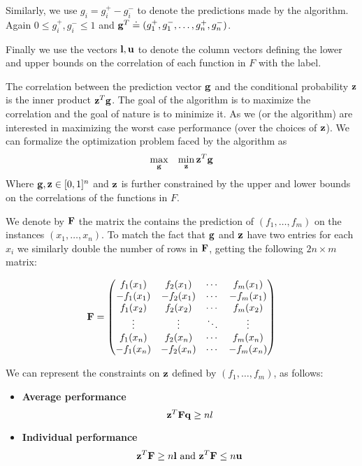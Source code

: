 \documentclass{article}[12pt]
\begin{document}
Similarly, we use $g_i =g_i^+ - g_i^-$ to denote the predictions made
by the algorithm. Again $0 \leq g_i^+,g_i^- \leq 1$ and 
$\mathbf{g}^T \doteq (g_1^+,g_1^-,\ldots, g_n^+,g_n^-)$.

Finally we use the vectors $\mathbf{l},\mathbf{u}$ to denote the column vectors 
defining the lower and upper bounds on the correlation of each
function in $F$ with the label.

The correlation between the prediction vector $\mathbf{g}$ and the
conditional probability $\mathbf{z}$ is the inner product $\mathbf{z}^T \mathbf{g}$. The
goal of the algorithm is to maximize the correlation and the goal of
nature is to minimize it. As we (or the algorithm) are interested in
maximizing the worst case performance (over the choices of $\mathbf{z}$). We
can formalize the optimization problem faced by the algorithm as
\[
\max_{\mathbf{g}}\;\;\; \min_{\mathbf{z}} \mathbf{z}^T \mathbf{g}
\]
Where $\mathbf{g},\mathbf{z} \in [0,1]^n$ and $\mathbf{z}$ is further constrained by the
upper and lower bounds on the correlations of the functions in $F$.

We denote by $\mathbf{F}$ the matrix the contains the prediction of
$(f_1,\ldots,f_m)$ on the instances $(x_1,\ldots,x_n)$. To match the
fact that $\mathbf{g}$ and $\mathbf{z}$ have two entries for each $x_i$ we similarly
double the number of rows in $\mathbf{F}$, getting the following $2n \times
m$ matrix:

\begin{equation}
\mathbf{F} = 
 \begin{pmatrix}
   f_1(x_1) &  f_2(x_1) & \cdots &  f_m(x_1) \\
  -f_1(x_1) & -f_2(x_1) & \cdots & -f_m(x_1) \\
   f_1(x_2) &  f_2(x_2) & \cdots &  f_m(x_2) \\
   \vdots   & \vdots    & \ddots &  \vdots  \\
   f_1(x_n)  &  f_2(x_n)  & \cdots &   f_m(x_n) \\
  -f_1(x_n)  & -f_2(x_n)  & \cdots &  -f_m(x_n) 
 \end{pmatrix}
\end{equation}

We can represent the constraints on $\mathbf{z}$ defined by
$(f_1,\ldots,f_m)$, as follows:
\begin{itemize}
\item {\bf Average performance}
\[
\mathbf{z}^T \mathbf{F} \mathbf{q} \geq nl
\]
\item {\bf Individual performance}
\[
\mathbf{z}^T \mathbf{F} \geq n \mathbf{l} \mbox{ and } \mathbf{z}^T \mathbf{F} \leq n \mathbf{u}
\]
\end{itemize}
\end{document}
